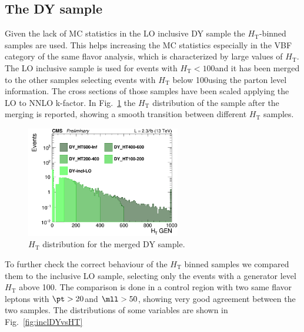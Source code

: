 \subsection{The DY sample}\label{sec:DY}

Given the lack of MC statistics in the LO inclusive DY sample the
$H_\mathrm{T}$-binned samples are used. This helps increasing the MC
statistics especially in the VBF category of the same flavor analysis, which is characterized by large values of $H_\mathrm{T}$.
The LO inclusive sample is used for events with $H_\mathrm{T} < 100$\GeV and it has been merged to the other samples selecting events with $H_\mathrm{T}$ below 100\GeV using the parton level information. The cross sections of those samples have been scaled applying the LO to NNLO k-factor. In Fig.~\ref{fig:DY_HT} the $H_\mathrm{T}$ distribution of the sample after the merging is reported, showing a smooth transition between different $H_\mathrm{T}$ samples.

\begin{figure}[htbp]
\centering
\includegraphics[width=0.6\textwidth]{Figs/log_c_incl_HTGen.png}
\caption{
    $H_\mathrm{T}$ distribution for the merged DY sample.}
    \label{fig:DY_HT}
\end{figure}


To further check the correct behaviour of the $H_\mathrm{T}$ binned samples we compared them to the inclusive LO sample, selecting only the events with a generator level $H_\mathrm{T}$ above 100\GeV. The comparison is done in a control region with two same flavor leptons with $\pt > 20$\GeV and $\mll > 50$\GeV, showing very good agreement between the two samples. The distributions of some variables are shown in Fig.~\ref{fig:inclDYvsHT}


